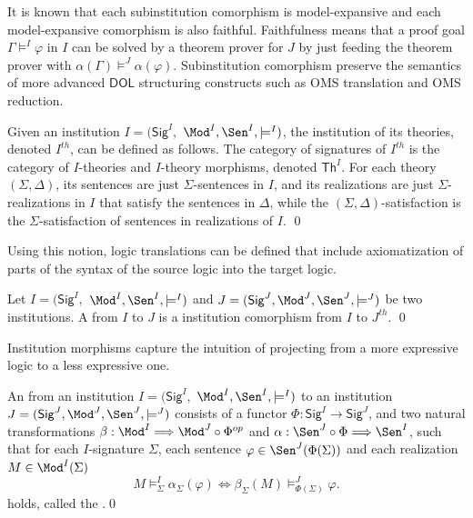 \documentclass[10pt, a4paper]{isov2}
\newcommand{\Sig}{\mathsf{Sig}}
\renewcommand{\Th}{\mathsf{Th}}
\newcommand*{\DOL}{\ensuremath{\mathsf{DOL}}\xspace}
\begin{document}
It is known that each subinstitution comorphism is model-expansive and
each model-expansive comorphism
is also faithful.
Faithfulness means that a proof goal $\Gamma\models^I\varphi$
in $I$ can be solved by a theorem prover for $J$ by just feeding the
theorem prover with $\alpha(\Gamma)\models^J\alpha(\varphi)$.
Subinstitution comorphism preserve
the semantics of more advanced \DOL structuring constructs such
as OMS translation and OMS reduction.


\begin{definition}
  Given an institution  $I = (\Sig^I,$ $ \Mod^I, \Sen^I, \models^I)$, the
   institution of its theories, denoted $I^{th}$, can be defined as follows. The category of signatures of $I^{th}$ is the category
   of $I$-theories and $I$-theory morphisms, denoted $\Th^I$.
   For each theory $(\Sigma, \Delta)$, its sentences are just $\Sigma$-sentences in $I$, and
   its realizations are just $\Sigma$-realizations in $I$ that satisfy the sentences in $\Delta$, while the
   $(\Sigma,\Delta)$-satisfaction is the $\Sigma$-satisfaction of sentences in realizations of $I$.
\qed \end{definition}

Using this notion, logic translations can be defined that include axiomatization of parts of the
syntax of the source logic into the target logic.

\begin{definition}

 Let $I = (\Sig^I,$ $ \Mod^I, \Sen^I, \models^I)$ and $J = (\Sig^J, \Mod^J,
\Sen^J, \models^J)$ be two institutions. A  from $I$ to
$J$ is a institution comorphism from $I$ to $J^{th}$.
\qed\end{definition}

\medskip

Institution morphisms capture the intuition of projecting from a more expressive logic to a less expressive one.

\begin{definition}
An  from an institution $I = (\Sig^I,$ $ \Mod^I, \Sen^I, \models^I)$ to
an institution $J = (\Sig^J, \Mod^J,
\Sen^J, \models^J)$ consists of a functor $\Phi : \Sig^I \longrightarrow \Sig^J$, and two
natural transformations $\beta: \Mod^I \Longrightarrow \Mod^J \circ \Phi^{op}$
and $\alpha:  \Sen^J \circ \Phi \Longrightarrow \Sen^I $, such that for each $I$-signature $\Sigma$, each sentence $\varphi\in\Sen^J(\Phi(\Sigma))$ and each realization $M\in\Mod^I(\Sigma)$
%
\begin{equation*}
  M\models^{I}_{\Sigma}\alpha_{\Sigma}(\varphi)
\iff
  \beta_{\Sigma}(M)\models^J_{\Phi(\Sigma)}\varphi.
\end{equation*}
holds, called the .\quad\qed
\end{definition}
\end{document}
